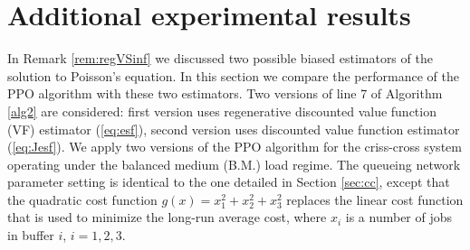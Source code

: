 \documentclass[11pt]{article}
\theoremstyle{definition}
\numberwithin{equation}{section}
\begin{document}
%
%
%
%
%
%
%
%
%
%
%
%
%
%
%
%
%
%
%




\section{Additional experimental results}\label{sec:regVSinf}

In Remark \ref{rem:regVSinf} we discussed two possible biased
estimators of the solution to Poisson's equation. In this section we
compare the performance of the PPO algorithm with these two
estimators.  Two versions of line 7 of Algorithm \ref{alg2} are
considered: first version uses regenerative discounted value function
(VF) estimator (\ref{eq:esf}), second version uses discounted value
function estimator (\ref{eq:Jesf}). We apply two versions of the PPO
algorithm for the criss-cross system  operating under the  balanced medium (B.M.) load
regime.  The queueing network parameter setting is identical to
  the one detailed in Section \ref{sec:cc}, except that the quadratic
  cost function $g(x) = x_1^2+x_2^2+x_3^2$ replaces the linear
  cost function that is used to minimize the long-run average cost, where
$x_i$ is a number of jobs in buffer $i$, $i=1, 2, 3.$
\end{document}
